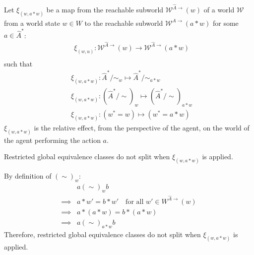 Let $\xi_{(w, a \ast w)}$ be a map from the reachable subworld $\mathscr{W}^{\hat{A}\to}(w)$ of a world $\mathscr{W}$ from a world state $w \in W$ to the reachable subworld $\mathscr{W}^{\hat{A}\to}(a \ast w)$ for some $a \in \hat{A}^{*}$:
\begin{align}
    & \xi_{(w, u)}: \mathscr{W}^{\hat{A}\to}(w) \to \mathscr{W}^{\hat{A}\to}(a \ast w) \\
\end{align}
such that
\begin{align}
    & \xi_{(w, a \ast w)}: \hat{A}^{*}/\sim_{w} \mapsto \hat{A}^{*}/\sim_{a \ast w} \\
    & \xi_{(w, a \ast w)}: (\hat{A}^{*}/\sim)_{w} \mapsto (\hat{A}^{*}/\sim)_{a \ast w} \\
    & \xi_{(w, a \ast w)}: (w^{*}=w) \mapsto (w^{*}=a \ast w)
\end{align}
$\xi_{(w, a \ast w)}$ is the relative effect, from the perspective of the agent, on the world of the agent performing the action $a$.

\begin{propositionE}
    Restricted global equivalence classes do not split when $\xi_{(w, a \ast w)}$ is applied.
\end{propositionE}
\begin{proofE}
    By definition of $(\sim)_{w}$:
    \begin{align}
        & a (\sim)_{w} b \\
        \implies & a \ast w' = b \ast w' \quad \text{for all $w' \in W^{\hat{A}\to}(w)$} \\
        \implies & a \ast (a \ast w) = b \ast (a \ast w) \\
        \implies & a (\sim)_{a \ast w} b
    \end{align}
    Therefore, restricted global equivalence classes do not split when $\xi_{(w, a \ast w)}$ is applied. 
\end{proofE}

